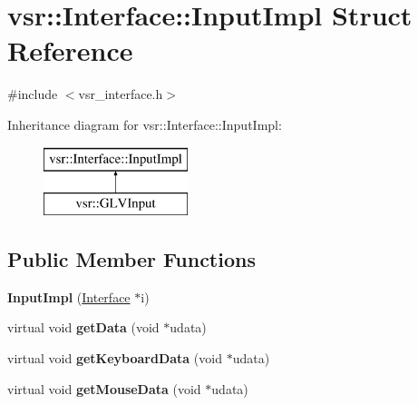 \hypertarget{structvsr_1_1_interface_1_1_input_impl}{\section{vsr\-:\-:Interface\-:\-:Input\-Impl Struct Reference}
\label{structvsr_1_1_interface_1_1_input_impl}
}


{\ttfamily \#include $<$vsr\-\_\-interface.\-h$>$}

Inheritance diagram for vsr\-:\-:Interface\-:\-:Input\-Impl\-:\begin{figure}[H]
\begin{center}
\leavevmode
\includegraphics[height=2.000000cm]{structvsr_1_1_interface_1_1_input_impl}
\end{center}
\end{figure}
\subsection*{Public Member Functions}
\begin{DoxyCompactItemize}
\item 
\hypertarget{structvsr_1_1_interface_1_1_input_impl_a45d3f879d37bff2a6360c5627842e98c}{{\bfseries Input\-Impl} (\hyperlink{classvsr_1_1_interface}{Interface} $\ast$i)}\label{structvsr_1_1_interface_1_1_input_impl_a45d3f879d37bff2a6360c5627842e98c}

\item 
\hypertarget{structvsr_1_1_interface_1_1_input_impl_a5312b629280e42c00bc3c681c2ab70f9}{virtual void {\bfseries get\-Data} (void $\ast$udata)}\label{structvsr_1_1_interface_1_1_input_impl_a5312b629280e42c00bc3c681c2ab70f9}

\item 
\hypertarget{structvsr_1_1_interface_1_1_input_impl_acece3c05fe1034fbbdfdd3e56f1b011b}{virtual void {\bfseries get\-Keyboard\-Data} (void $\ast$udata)}\label{structvsr_1_1_interface_1_1_input_impl_acece3c05fe1034fbbdfdd3e56f1b011b}

\item 
\hypertarget{structvsr_1_1_interface_1_1_input_impl_ab1b748194129b800b1dd10be19dd1655}{virtual void {\bfseries get\-Mouse\-Data} (void $\ast$udata)}\label{structvsr_1_1_interface_1_1_input_impl_ab1b748194129b800b1dd10be19dd1655}

\end{DoxyCompactItemize}
